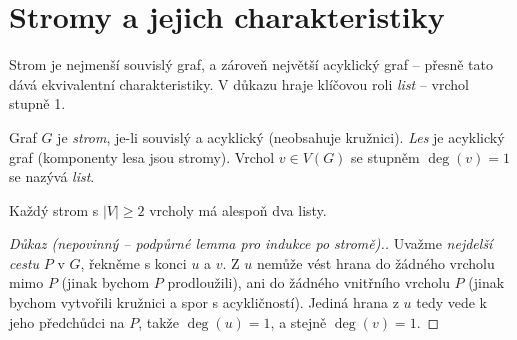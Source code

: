 \documentclass[11pt,a4paper]{article}
\begin{document}
\section{Stromy a jejich charakteristiky}

Strom je nejmenší souvislý graf, a zároveň největší acyklický graf -- přesně tato  dává ekvivalentní charakteristiky. V důkazu hraje klíčovou roli \emph{list} -- vrchol stupně 1.

\begin{definice}
Graf $G$ je \emph{strom}, je-li souvislý a acyklický (neobsahuje kružnici). \emph{Les} je acyklický graf (komponenty lesa jsou stromy). Vrchol $v\in V(G)$ se stupněm $\deg(v)=1$ se nazývá \emph{list}.
\end{definice}

\begin{lemma}
Každý strom s $|V|\ge 2$ vrcholy má alespoň dva listy.
\end{lemma}

\begin{proof}[Důkaz \textnormal{(nepovinný -- podpůrné lemma pro indukce po stromě).}]
Uvažme \emph{nejdelší cestu} $P$ v $G$, řekněme s konci $u$ a $v$. Z $u$ nemůže vést hrana do žádného vrcholu mimo $P$ (jinak bychom $P$ prodloužili), ani do žádného vnitřního vrcholu $P$ (jinak bychom vytvořili kružnici a spor s acykličností). Jediná hrana z $u$ tedy vede k jeho předchůdci na $P$, takže $\deg(u)=1$, a stejně $\deg(v)=1$.
\end{proof}

\begin{center}
\end{center}
\end{document}
